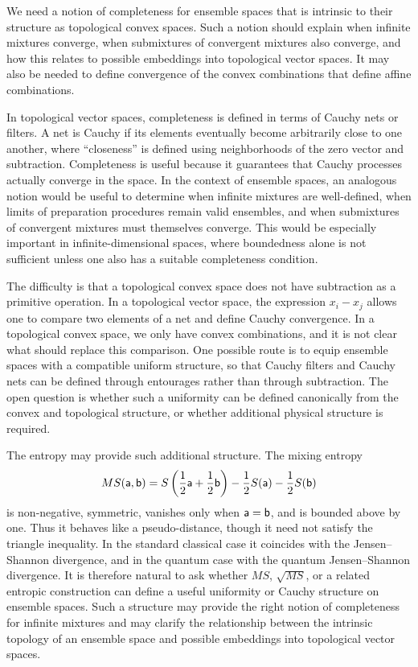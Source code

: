 {We need a notion of completeness for ensemble spaces that is intrinsic to their structure as topological convex spaces. Such a notion should explain when infinite mixtures converge, when submixtures of convergent mixtures also converge, and how this relates to possible embeddings into topological vector spaces. It may also be needed to define convergence of the convex combinations that define affine combinations.}

In topological vector spaces, completeness is defined in terms of Cauchy nets or filters. A net is Cauchy if its elements eventually become arbitrarily close to one another, where ``closeness'' is defined using neighborhoods of the zero vector and subtraction. Completeness is useful because it guarantees that Cauchy processes actually converge in the space. In the context of ensemble spaces, an analogous notion would be useful to determine when infinite mixtures are well-defined, when limits of preparation procedures remain valid ensembles, and when submixtures of convergent mixtures must themselves converge. This would be especially important in infinite-dimensional spaces, where boundedness alone is not sufficient unless one also has a suitable completeness condition.

The difficulty is that a topological convex space does not have subtraction as a primitive operation. In a topological vector space, the expression \(x_i-x_j\) allows one to compare two elements of a net and define Cauchy convergence. In a topological convex space, we only have convex combinations, and it is not clear what should replace this comparison. One possible route is to equip ensemble spaces with a compatible uniform structure, so that Cauchy filters and Cauchy nets can be defined through entourages rather than through subtraction. The open question is whether such a uniformity can be defined canonically from the convex and topological structure, or whether additional physical structure is required.

The entropy may provide such additional structure. The mixing entropy
\[
MS(\ens[a],\ens[b])
=
S\left(\frac{1}{2}\ens[a]+\frac{1}{2}\ens[b]\right)
-
\frac{1}{2}S(\ens[a])
-
\frac{1}{2}S(\ens[b])
\]
is non-negative, symmetric, vanishes only when \(\ens[a]=\ens[b]\), and is bounded above by one. Thus it behaves like a pseudo-distance, though it need not satisfy the triangle inequality. In the standard classical case it coincides with the Jensen--Shannon divergence, and in the quantum case with the quantum Jensen--Shannon divergence. It is therefore natural to ask whether \(MS\), \(\sqrt{MS}\), or a related entropic construction can define a useful uniformity or Cauchy structure on ensemble spaces. Such a structure may provide the right notion of completeness for infinite mixtures and may clarify the relationship between the intrinsic topology of an ensemble space and possible embeddings into topological vector spaces.

